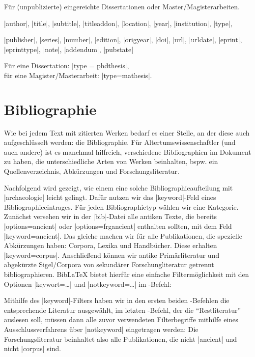 \documentclass[a4paper,10pt,ngerman]{ltxdoc}
\begin{document}


  Für (unpublizierte) eingereichte Dissertationen oder Master/Magisterarbeiten.
\begin{description}[topsep=0pt]
\item[Notwendig:] |author|, |title|, |subtitle|, |titleaddon|, |location|, |year|, |institution|,  |type|, 
\item[Optional:] |publisher|, |series|, |number|, |edition|, |origyear|, |doi|, |url|, |urldate|, |eprint|, |eprinttype|, |note|, |addendum|, |pubstate|
\end{description}

Für eine Dissertation:  |type = {phdthesis}|, \\ für eine Magister/Masterarbeit: |type={mathesis}|.



\section{Bibliographie}\label{bibliographie}
\DescribeMacro{\printbibliography}
Wie bei jedem Text mit zitierten Werken bedarf es einer Stelle, an der diese auch aufgeschlüsselt werden: die Bibliographie. 
Für Altertumswissenschaftler (und auch andere) ist es manchmal hilfreich, verschiedene Bibliographien im Dokument zu haben, die unterschiedliche Arten von Werken beinhalten, bspw. ein Quellenverzeichnis, Abkürzungen und Forschungsliteratur. 

Nachfolgend wird gezeigt, wie einem eine solche Bibliographieaufteilung mit |archaeologie| leicht gelingt. Dafür nutzen wir das |keyword|-Feld eines Bibliographieeintrages. Für jeden Bibliographietyp wählen wir eine Kategorie. Zunächst versehen wir in der |bib|-Datei  alle antiken Texte, die bereits |options={ancient}| oder |options={frgancient}| enthalten sollten, mit dem Feld |keyword={ancient}|. Das gleiche machen wir für alle Publikationen, die spezielle Abkürzungen haben: Corpora, Lexika und Handbücher. Diese erhalten |keyword={corpus}|. Anschließend können wir antike Primärliteratur und abgekürzte Sigel/Corpora von sekundärer Forschungliteratur getrennt bibliographieren. Bib\LaTeX{} bietet hierfür eine einfache Filtermöglichkeit mit den Optionen |keywort=…| und |notkeyword=…| im -Befehl:


Mithilfe des |keyword|-Filters haben wir in den ersten beiden -Befehlen die entsprechende Literatur ausgewählt, im letzten -Befehl, der die \enquote{Restliteratur} auslesen soll, müssen dann alle zuvor verwendeten Filterbegriffe mithilfe eines Ausschlussverfahrens über |notkeyword| eingetragen werden: Die Forschungsliteratur beinhaltet also alle Publikationen, die nicht |ancient| und nicht |corpus| sind.
\end{document}
